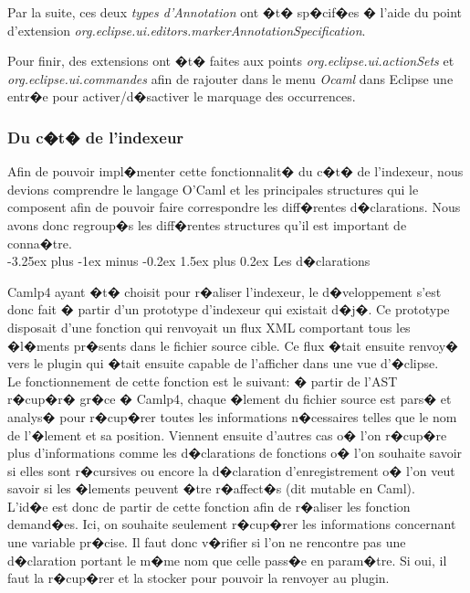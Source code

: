 \documentclass[a4paper,11pt,titlepage]{article}
\makeatletter
\renewcommand{\paragraph}{\@startsection{paragraph}{4}{0ex}%
   {-3.25ex plus -1ex minus -0.2ex}%
   {1.5ex plus 0.2ex}%
   {\normalfont\normalsize\bfseries}}
\makeatother
\begin{document}
Par la suite, ces deux \textit{types d'Annotation} ont �t� sp�cif�es � l'aide du point d'extension \textit{org.eclipse.ui.editors.markerAnnotationSpecification}. 

Pour finir, des extensions ont �t� faites aux points \textit{org.eclipse.ui.actionSets} et \\\textit{org.eclipse.ui.commandes} afin de rajouter dans le menu \textit{Ocaml} dans Eclipse une entr�e pour activer/d�sactiver le marquage des occurrences.\\

\newpage
\subsubsection{Du c�t� de l'indexeur}

Afin de pouvoir impl�menter cette fonctionnalit� du c�t� de l'indexeur, nous devions comprendre le langage O'Caml et les principales structures qui le composent afin de pouvoir faire correspondre les diff�rentes d�clarations. Nous avons donc regroup�s les diff�rentes structures qu'il est important de conna�tre.\\


\paragraph{Les d�clarations}

Camlp4 ayant �t� choisit pour r�aliser l'indexeur, le d�veloppement s'est donc fait � partir d'un prototype d'indexeur qui existait d�j�. Ce prototype disposait d'une fonction qui renvoyait un flux XML comportant tous les �l�ments pr�sents dans le fichier source cible. Ce flux �tait ensuite renvoy� vers le plugin qui �tait ensuite capable de l'afficher dans une vue d'�clipse.\\

Le fonctionnement de cette fonction est le suivant: � partir de l'AST r�cup�r� gr�ce � Camlp4, chaque �lement du fichier source est pars� et analys� pour r�cup�rer toutes les informations n�cessaires telles que le nom de l'�lement et sa position. Viennent ensuite d'autres cas o� l'on r�cup�re plus d'informations comme les d�clarations de fonctions o� l'on souhaite savoir si elles sont r�cursives ou encore la d�claration d'enregistrement o� l'on veut savoir si les �lements peuvent �tre r�affect�s (dit mutable en Caml). \\

L'id�e est donc de partir de cette fonction afin de r�aliser les fonction demand�es. Ici, on souhaite seulement r�cup�rer les informations concernant une variable pr�cise. Il faut donc v�rifier si l'on ne rencontre pas une d�claration portant le m�me nom que celle pass�e en param�tre. Si oui, il faut la r�cup�rer et la stocker pour pouvoir la renvoyer au plugin.
\end{document}
